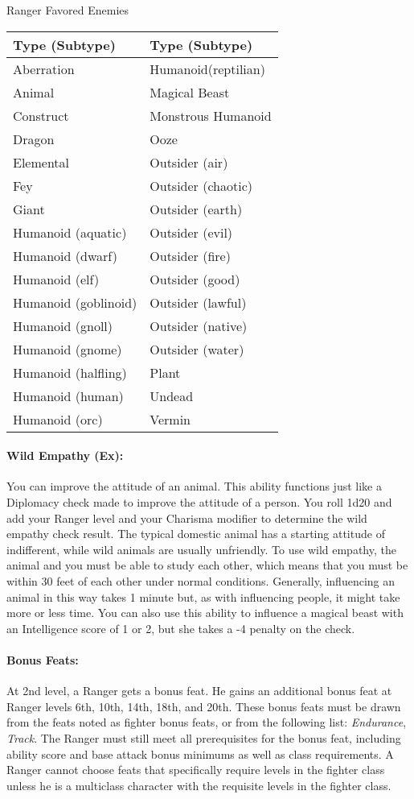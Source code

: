 \begin{tableonecolumn}
\caption{Ranger Favored Enemies}
\label{tab:RangerFE}
\begin{tabular}{|l|l|}
\hline
Type (Subtype)&Type (Subtype)\\
\hline
Aberration&Humanoid(reptilian)\\
Animal&Magical Beast\\
Construct&Monstrous Humanoid\\
Dragon&Ooze\\
Elemental&Outsider (air)\\
Fey&Outsider (chaotic)\\
Giant&Outsider (earth)\\
Humanoid (aquatic)&Outsider (evil)\\
Humanoid (dwarf)&Outsider (fire)\\
Humanoid (elf)&Outsider (good)\\
Humanoid (goblinoid)&Outsider (lawful)\\
Humanoid (gnoll)&Outsider (native)\\
Humanoid (gnome)&Outsider (water)\\
Humanoid (halfling)&Plant\\
Humanoid (human)&Undead\\
Humanoid (orc)&Vermin\\
\hline
\end{tabular}
\end{tableonecolumn}

\paragraph[Wild Empathy]{Wild Empathy (Ex):}
\label{sec:WildEmpathy}
You can improve the attitude of an animal.
This ability functions just like a Diplomacy check made to improve the attitude of a person. 
You roll 1d20 and add your Ranger level and your Charisma modifier to determine the wild empathy check result.
The typical domestic animal has a starting attitude of indifferent, while wild animals are usually unfriendly.
To use wild empathy, the animal and you must be able to study each other, 
which means that you must be within 30 feet of each other under normal conditions. 
Generally, influencing an animal in this way takes 1 minute but, as with influencing people, it might take more or less time.
You can also use this ability to influence a magical beast with an Intelligence score of 1 or 2, but she takes a -4 penalty on the check.
\paragraph{Bonus Feats:}
At 2nd level, a Ranger gets a bonus feat.
He gains an additional bonus feat at Ranger levels 6th, 10th, 14th, 18th, and 20th. 
These bonus feats must be drawn from the feats noted as fighter bonus feats, or from the following list: \emph{Endurance}, \emph{Track}. 
The Ranger must still meet all prerequisites for the bonus feat, including ability score and base attack bonus minimums as well as class requirements. 
A Ranger cannot choose feats that specifically require levels in the fighter class unless he is a multiclass character with the requisite levels in the fighter class.


